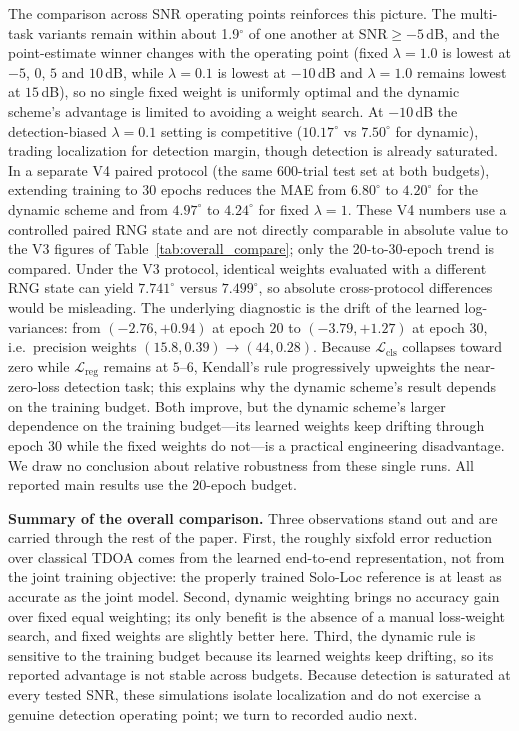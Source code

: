 \documentclass[sensors,article,submit,pdftex,moreauthors]{Definitions/mdpi}
\begin{document}
The comparison across SNR operating points reinforces this picture. The multi-task variants remain within about 1.9$^\circ$ of one another at SNR$\geq-5$\,dB, and the point-estimate winner changes with the operating point (fixed $\lambda=1.0$ is lowest at $-5$, $0$, $5$ and $10$\,dB, while $\lambda=0.1$ is lowest at $-10$\,dB and $\lambda=1.0$ remains lowest at $15$\,dB), so no single fixed weight is uniformly optimal and the dynamic scheme's advantage is limited to avoiding a weight search. At $-10$\,dB the detection-biased $\lambda=0.1$ setting is competitive ($10.17^\circ$ vs $7.50^\circ$ for dynamic), trading localization for detection margin, though detection is already saturated. In a separate V4 paired protocol (the same $600$-trial test set at both budgets), extending training to $30$ epochs reduces the MAE from $6.80^\circ$ to $4.20^\circ$ for the dynamic scheme and from $4.97^\circ$ to $4.24^\circ$ for fixed $\lambda=1$. These V4 numbers use a controlled paired RNG state and are not directly comparable in absolute value to the V3 figures of Table~\ref{tab:overall_compare}; only the 20-to-30-epoch trend is compared. Under the V3 protocol, identical weights evaluated with a different RNG state can yield $7.741^\circ$ versus $7.499^\circ$, so absolute cross-protocol differences would be misleading. The underlying diagnostic is the drift of the learned log-variances: from $(-2.76,+0.94)$ at epoch $20$ to $(-3.79,+1.27)$ at epoch $30$, i.e.\ precision weights $(15.8,0.39)\to(44,0.28)$. Because $\mathcal{L}_{\mathrm{cls}}$ collapses toward zero while $\mathcal{L}_{\mathrm{reg}}$ remains at $5$--$6$, Kendall's rule progressively upweights the near-zero-loss detection task; this explains why the dynamic scheme's result depends on the training budget. Both improve, but the dynamic scheme's larger dependence on the training budget---its learned weights keep drifting through epoch $30$ while the fixed weights do not---is a practical engineering disadvantage. We draw no conclusion about relative robustness from these single runs. All reported main results use the $20$-epoch budget.

\textbf{Summary of the overall comparison.} Three observations stand out and are carried through the rest of the paper. First, the roughly sixfold error reduction over classical TDOA comes from the learned end-to-end representation, not from the joint training objective: the properly trained Solo-Loc reference is at least as accurate as the joint model. Second, dynamic weighting brings no accuracy gain over fixed equal weighting; its only benefit is the absence of a manual loss-weight search, and fixed weights are slightly better here. Third, the dynamic rule is sensitive to the training budget because its learned weights keep drifting, so its reported advantage is not stable across budgets. Because detection is saturated at every tested SNR, these simulations isolate localization and do not exercise a genuine detection operating point; we turn to recorded audio next.
\end{document}
